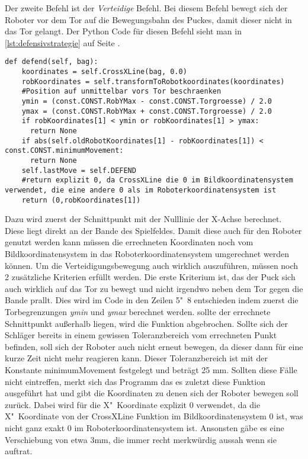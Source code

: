 Der zweite Befehl ist der \textit{Verteidige} Befehl. Bei diesem Befehl bewegt sich der Roboter vor dem Tor auf die Bewegungsbahn des Puckes, damit dieser nicht in das Tor gelangt. Der Python Code für diesen Befehl sieht man in \ref{lst:defensivstrategie} auf Seite \pageref{lst:defensivstrategie}.
\begin{lstlisting}[caption= python-funktion für Defensivstrategie, label=lst:defensivstrategie]
def defend(self, bag):
	koordinates = self.CrossXLine(bag, 0.0)
	robKoordinates = self.transformToRobotkoordinates(koordinates)
	#Position auf unmittelbar vors Tor beschraenken
	ymin = (const.CONST.RobYMax - const.CONST.Torgroesse) / 2.0
	ymax = (const.CONST.RobYMax + const.CONST.Torgroesse) / 2.0
	if robKoordinates[1] < ymin or robKoordinates[1] > ymax:
	  return None
	if abs(self.oldRobotKoordinates[1] - robKoordinates[1]) < const.CONST.minimumMovement:
	  return None
	self.lastMove = self.DEFEND
	#return explizit 0, da CrossXLine die 0 im Bildkoordinatensystem verwendet, die eine andere 0 als im Roboterkoordinatensystem ist
	return (0,robKoordinates[1])
\end{lstlisting}
Dazu wird zuerst der Schnittpunkt mit der Nulllinie der X-Achse berechnet. Diese liegt direkt an der Bande des Spielfeldes. Damit diese auch für den Roboter genutzt werden kann müssen die errechneten Koordinaten noch vom Bildkoordinatensystem in das Roboterkoordinatensystem umgerechnet werden können. Um die Verteidigungsbewegung auch wirklich auszuführen, müssen noch 2 zusätzliche Kriterien erfüllt werden. Die erste Kriterium ist, das der Puck sich auch wirklich auf das Tor zu bewegt und nicht irgendwo neben dem Tor gegen die Bande prallt. Dies wird im Code in den Zeilen 5"~8 entschieden indem zuerst die Torbegrenzungen  \textit{ymin} und \textit{ymax} berechnet werden. sollte der errechnete Schnittpunkt außerhalb liegen, wird die Funktion abgebrochen. Sollte sich der Schläger bereits in einem gewissen Toleranzbereich vom errechneten Punkt befinden, soll sich der Roboter auch nicht erneut bewegen, da dieser dann für eine kurze Zeit nicht mehr reagieren kann. Dieser Toleranzbereich ist mit der Konstante minimumMovement festgelegt und beträgt 25 mm. Sollten diese Fälle nicht eintreffen, merkt sich das Programm das es zuletzt diese Funktion ausgeführt hat und gibt die Koordinaten zu denen sich der Roboter bewegen soll zurück. Dabei wird für die X"~Koordinate explizit 0 verwendet, da die X"~Koordinate von der CrossXLine Funktion im Bildkoordinatensystem 0 ist, was nicht ganz exakt 0 im Roboterkoordinatensystem ist. Ansonsten gäbe es eine Verschiebung von etwa 3mm, die immer recht merkwürdig aussah wenn sie auftrat.


